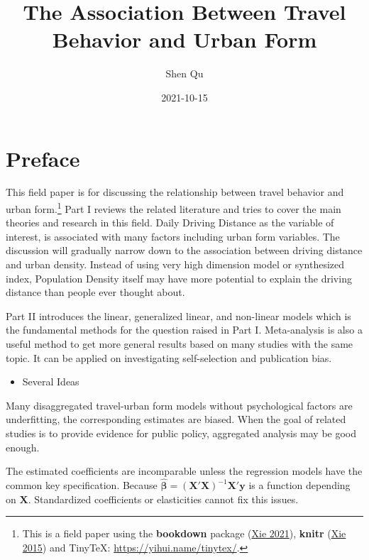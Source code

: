 \documentclass[
  11pt,
  openany]{memoir}
\title{The Association Between Travel Behavior and Urban Form}
\author{Shen Qu}
\date{2021-10-15}
\providecommand{\tightlist}{%
  \setlength{\itemsep}{0pt}\setlength{\parskip}{0pt}}
\begin{document}
\maketitle

{
\setcounter{tocdepth}{1}
\tableofcontents
}
\hypertarget{preface}{%
\chapter*{Preface}\label{preface}}

This field paper is for discussing the relationship between travel behavior and urban form.\footnote{This is a field paper using the \textbf{bookdown} package (\protect\hyperlink{ref-R-bookdown}{Xie 2021}), \textbf{knitr} (\protect\hyperlink{ref-xie2015}{Xie 2015}) and TinyTeX: \url{https://yihui.name/tinytex/}.}
Part I reviews the related literature and tries to cover the main theories and research in this field.
Daily Driving Distance as the variable of interest, is associated with many factors including urban form variables.
The discussion will gradually narrow down to the association between driving distance and urban density.
Instead of using very high dimension model or synthesized index,
Population Density itself may have more potential to explain the driving distance than people ever thought about.

Part II introduces the linear, generalized linear, and non-linear models which is the fundamental methods for the question raised in Part I.
Meta-analysis is also a useful method to get more general results based on many studies with the same topic.
It can be applied on investigating self-selection and publication bias.

\begin{itemize}
\tightlist
\item
  Several Ideas
\end{itemize}

Many disaggregated travel-urban form models without psychological factors are underfitting, the corresponding estimates are biased.
When the goal of related studies is to provide evidence for public policy, aggregated analysis may be good enough.

The estimated coefficients are incomparable unless the regression models have the common key specification. Because \(\boldsymbol{\hat\beta}=(\mathbf{X'X})^{-1}\mathbf{X'}\mathbf{y}\) is a function depending on \(\mathbf{X}\).
Standardized coefficients or elasticities cannot fix this issues.
\end{document}
